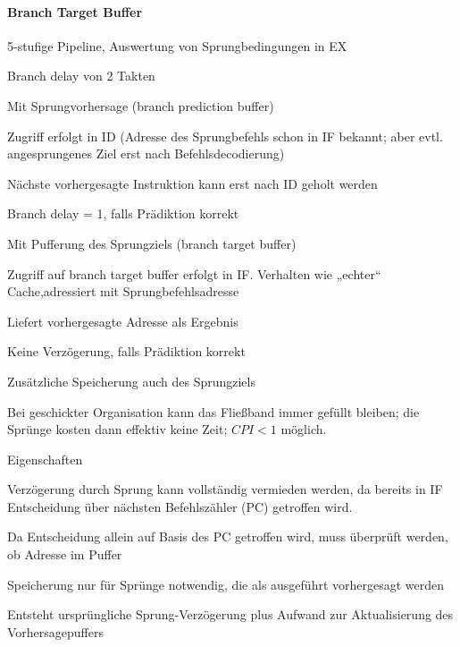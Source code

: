 \documentclass[10pt,landscape]{article}
\begin{document}
\begin{multicols}{3}
  \paragraph{ Branch Target Buffer}
  5-stufige Pipeline, Auswertung von Sprungbedingungen in EX
  \begin{itemize*}
    \item Branch delay von 2 Takten
    \item Mit Sprungvorhersage (branch prediction buffer)
    \item Zugriff erfolgt in ID (Adresse des Sprungbefehls schon in IF bekannt; aber evtl. angesprungenes Ziel erst nach Befehlsdecodierung)
    \item Nächste vorhergesagte Instruktion kann erst nach ID geholt werden
    \item Branch delay = 1, falls Prädiktion korrekt
    \item Mit Pufferung des Sprungziels (branch target buffer)
    \item Zugriff auf branch target buffer erfolgt in IF. Verhalten wie „echter“ Cache,adressiert mit Sprungbefehlsadresse
    \item Liefert vorhergesagte Adresse als Ergebnis
    \item Keine Verzögerung, falls Prädiktion korrekt
    \item Zusätzliche Speicherung auch des Sprungziels
    \item Bei geschickter Organisation kann das Fließband immer gefüllt bleiben; die Sprünge kosten dann effektiv keine Zeit; $CPI <1$ möglich.
  \end{itemize*}
  
  Eigenschaften
  \begin{itemize*}
    \item Verzögerung durch Sprung kann vollständig vermieden werden, da bereits in IF Entscheidung über nächsten Befehlszähler (PC) getroffen wird.
    \item Da Entscheidung allein auf Basis des PC getroffen wird, muss überprüft werden, ob Adresse im Puffer
    \item Speicherung nur für Sprünge notwendig, die als ausgeführt vorhergesagt werden
    \item Entsteht ursprüngliche Sprung-Verzögerung plus Aufwand zur Aktualisierung des Vorhersagepuffers
  \end{itemize*}
  

\end{multicols}
\end{document}
